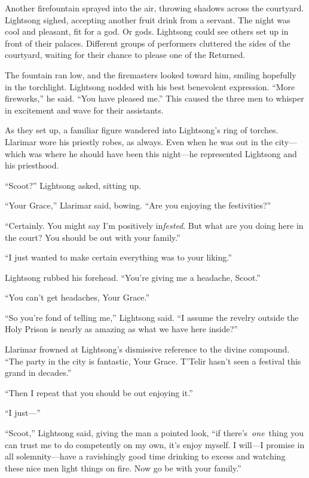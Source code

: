 Another firefountain sprayed into the air, throwing shadows across the courtyard. Lightsong sighed, accepting another fruit drink from a servant. The night was cool and pleasant, fit for a god. Or gods. Lightsong could see others set up in front of their palaces. Different groups of performers cluttered the sides of the courtyard, waiting for their chance to please one of the Returned.

The fountain ran low, and the firemasters looked toward him, smiling hopefully in the torchlight. Lightsong nodded with his best benevolent expression. “More fireworks,” he said. “You have pleased me.” This caused the three men to whisper in excitement and wave for their assistants.

As they set up, a familiar figure wandered into Lightsong’s ring of torches. Llarimar wore his priestly robes, as always. Even when he was out in the city—which was where he should have been this night—he represented Lightsong and his priesthood.

“Scoot?” Lightsong asked, sitting up.

“Your Grace,” Llarimar said, bowing. “Are you enjoying the festivities?”

“Certainly. You might say I’m positively in\textit{fested}. But what are you doing here in the court? You should be out with your family.”

“I just wanted to make certain everything was to your liking.”

Lightsong rubbed his forehead. “You’re giving me a headache, Scoot.”

“You can’t get headaches, Your Grace.”

“So you’re fond of telling me,” Lightsong said. “I assume the revelry outside the Holy Prison is nearly as amazing as what we have here inside?”

Llarimar frowned at Lightsong’s dismissive reference to the divine compound. “The party in the city is fantastic, Your Grace. T’Telir hasn’t seen a festival this grand in decades.”

“Then I repeat that you should be out enjoying it.”

“I just—”

“Scoot,” Lightsong said, giving the man a pointed look, “if there’s~\textit{one}~thing you can trust me to do competently on my own, it’s enjoy myself. I will—I promise in all solemnity—have a ravishingly good time drinking to excess and watching these nice men light things on fire. Now go be with your family.”

